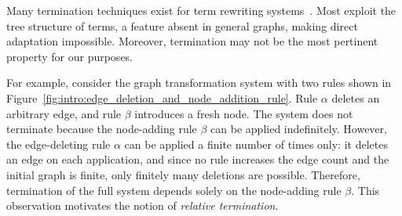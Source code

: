 Many termination techniques exist for term rewriting systems~\cite{nipkow1998term, dershowitz1982orderings, middeldorp1997simple, arts2000termination,contejean2005mechanically,urbain2004modular,contejean2011automated,giesl2014proving}.  
Most exploit the tree structure of terms, a feature absent in general graphs, making direct adaptation impossible. 
Moreover, termination may not be the most pertinent property for our purposes. 

For example, consider the graph transformation system with two rules shown in Figure~\ref{fig:intro:edge_deletion_and_node_addition_rule}. Rule $\alpha$ deletes an arbitrary edge, and rule $\beta$ introduces a fresh node. The system does not terminate because the node-adding rule $\beta$ can be applied indefinitely. However, the edge-deleting rule $\alpha$ can be applied a finite number of times only: it deletes an edge on each application, and since no rule increases the edge count and the initial graph is finite, only finitely many deletions are possible. Therefore, termination of the full system depends solely on the node-adding rule $\beta$. This observation motivates the notion of \emph{relative termination}.

